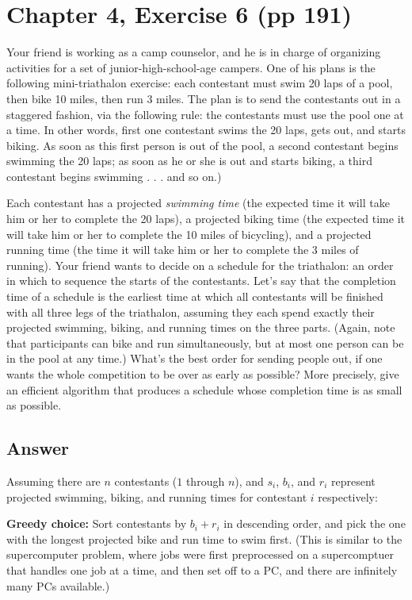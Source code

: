 \documentclass[12pt, letterpaper]{article}
\begin{document}
\section{Chapter 4, Exercise 6 (pp 191)}
Your friend is working as a camp counselor, and he is in charge of organizing activities for a set of junior-high-school-age campers. 
One of his plans is the following mini-triathalon exercise: each contestant must swim 20 laps of a pool, then bike 10 miles, then run 3 miles.
The plan is to send the contestants out in a staggered fashion, via the following rule: the contestants must use the pool one at a time. 
In other words, first one contestant swims the 20 laps, gets out, and starts biking. 
As soon as this first person is out of the pool, a second contestant begins swimming the 20 laps; 
as soon as he or she is out and starts biking, a third contestant begins swimming . . . and so on.)

Each contestant has a projected \textit{swimming time} (the expected time it will take him or her to complete the 20 laps), 
a projected biking time (the expected time it will take him or her to complete the 10 miles of bicycling), 
and a projected running time (the time it will take him or her to complete the 3 miles of running). 
Your friend wants to decide on a schedule for the triathalon: an order in which to sequence the starts of the contestants. 
Let's say that the completion time of a schedule is the earliest time at which all contestants will be finished with all three legs of the triathalon, 
assuming they each spend exactly their projected swimming, biking, and running times on the three parts. 
(Again, note that participants can bike and run simultaneously, but at most one person can be in the pool at any time.) 
What's the best order for sending people out, if one wants the whole competition to be over as early as possible? 
More precisely, give an efficient algorithm that produces a schedule whose completion time is as small as possible.

\subsection*{Answer}
Assuming there are $n$ contestants ($1$ through $n$), and $s_i$, $b_i$, and $r_i$ represent projected swimming, biking, and running times for contestant $i$ respectively:


\noindent\textbf{Greedy choice:} 
Sort contestants by $b_i + r_i$ in descending order, and pick the one with the longest projected bike and run time to swim first.
(This is similar to the supercomputer problem, where jobs were first preprocessed on a supercomptuer that handles one job at a time, and then set off to a PC, and there are infinitely many PCs available.)
\end{document}
